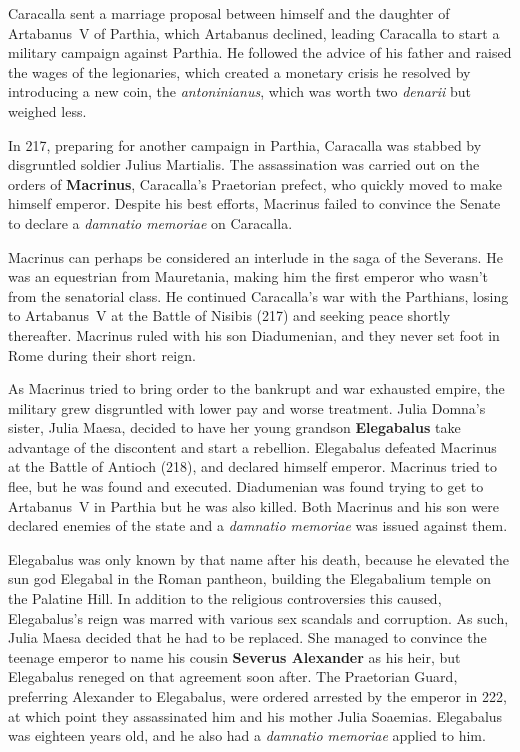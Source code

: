 Caracalla sent a marriage proposal between himself and the daughter of Artabanus~V of Parthia,
which Artabanus declined, leading Caracalla to start a military campaign against Parthia.
He followed the advice of his father and raised the wages of the legionaries,
which created a monetary crisis he resolved by introducing a new coin,
the \textit{antoninianus}, which was worth two \textit{denarii} but weighed less.

In 217, preparing for another campaign in Parthia,
Caracalla was stabbed by disgruntled soldier Julius Martialis.
The assassination was carried out on the orders of \textbf{Macrinus},
Caracalla's Praetorian prefect,
who quickly moved to make himself emperor.
Despite his best efforts,
Macrinus failed to convince the Senate to declare a \textit{damnatio memoriae} on Caracalla.

Macrinus can perhaps be considered an interlude in the saga of the Severans.
He was an equestrian from Mauretania,
making him the first emperor who wasn't from the senatorial class.
He continued Caracalla's war with the Parthians,
losing to Artabanus~V at the Battle of Nisibis (217) and seeking peace shortly thereafter.
Macrinus ruled with his son Diadumenian,
and they never set foot in Rome during their short reign.

As Macrinus tried to bring order to the bankrupt and war exhausted empire,
the military grew disgruntled with lower pay and worse treatment.
Julia Domna's sister, Julia Maesa, decided to have her young grandson \textbf{Elegabalus}
take advantage of the discontent and start a rebellion.
Elegabalus defeated Macrinus at the Battle of Antioch (218),
and declared himself emperor.
Macrinus tried to flee, but he was found and executed.
Diadumenian was found trying to get to Artabanus~V in Parthia but he was also killed.
Both Macrinus and his son were declared enemies of the state
and a \textit{damnatio memoriae} was issued against them.

Elegabalus was only known by that name after his death,
because he elevated the sun god Elegabal in the Roman pantheon,
building the Elegabalium temple on the Palatine Hill.
In addition to the religious controversies this caused,
Elegabalus's reign was marred with various sex scandals and corruption.
As such, Julia Maesa decided that he had to be replaced.
She managed to convince the teenage emperor to name his cousin \textbf{Severus Alexander}
as his heir,
but Elegabalus reneged on that agreement soon after.
The Praetorian Guard, preferring Alexander to Elegabalus,
were ordered arrested by the emperor in 222,
at which point they assassinated him and his mother Julia Soaemias.
Elegabalus was eighteen years old, and he also had a \textit{damnatio memoriae} applied to him.

